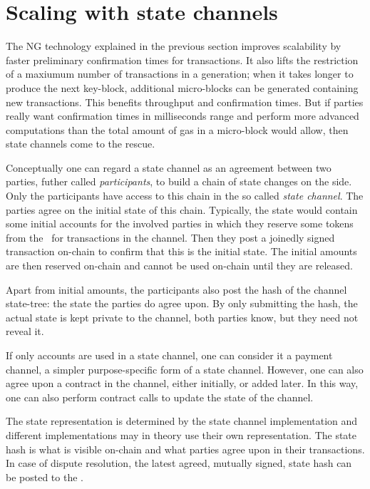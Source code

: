\section{Scaling with state channels}
\label{sect:channels}

The NG technology explained in the previous section improves
scalability by faster preliminary confirmation times for
transactions. It also lifts the restriction of a maxiumum number of transactions in a
generation; when it takes longer to produce the next key-block,
additional micro-blocks can be generated containing new transactions.
This benefits throughput and confirmation times. But if parties really
want confirmation times in milliseconds range and perform more advanced
computations than the total amount of gas in a micro-block would
allow, then state channels come to the rescue.

Conceptually one can regard a state channel as an agreement between
two parties, futher called \textit{participants}, to build a chain of
state changes on the side.
Only the participants have access to this chain in the so called
\textit{state channel}. The parties agree on the initial
state of this chain. Typically, the state would
contain some initial accounts for the involved parties in which they
reserve some tokens from the \blockchain\ for transactions in
the channel. Then they post a joinedly signed transaction on-chain to
confirm that this is the initial state.
The initial amounts are then reserved on-chain and cannot
be used on-chain until they are released.

Apart from initial amounts,
the participants also post the hash of the channel state-tree: the state the
parties do agree upon. By only submitting the hash, the actual state
is kept private to the channel, both parties know, but they need not
reveal it.

If only accounts are used in a state channel, one can consider it a
payment channel, a simpler purpose-specific form of a state channel.
However, one can also agree upon a contract in the
channel, either initially, or added later. In this way, one can also
perform contract calls to update the state of the channel.

The state representation is determined by the state channel
implementation and different implementations may in theory use
their own representation. The state hash is what is visible on-chain
and what parties agree upon in their transactions.
In case of dispute resolution, the
latest agreed, mutually signed, state hash can be posted to the \blockchain.

